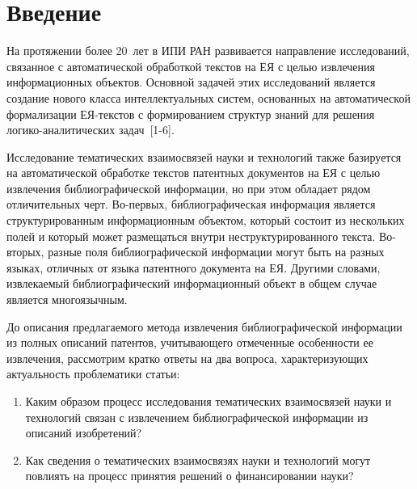 

      \thispagestyle{headings}

      \begin{multicols}{2}

            \label{st\stat}

\section{Введение}
      
      На протяжении более 20~лет в ИПИ РАН развивается направление исследований, 
связанное с автоматической обработкой текстов на ЕЯ с целью 
извлечения информационных объектов. Основной задачей этих исследований является создание 
нового класса интеллектуальных систем, основанных на автоматической формализации 
      ЕЯ-текс\-тов с формированием структур знаний для решения 
      ло\-ги\-ко-ана\-ли\-ти\-че\-ских задач~[1-6].
      
      Исследование тематических взаимосвязей науки и технологий также базируется на 
автоматической обработке текстов патентных документов на ЕЯ с целью извлечения 
библиографической ин\-формации, но при этом обладает рядом отличительных черт. 
      Во-пер\-вых, библиографическая информа\-ция является структурированным 
информационным объектом, который состоит из нескольких полей и который может 
размещаться внутри неструктурированного текста. Во-вто\-рых, разные поля 
библиографической информации могут быть на разных языках, отличных от языка патентного 
документа на ЕЯ. Другими словами, извлекаемый библиографический информационный объект 
в общем случае является многоязычным.
      
      До описания предлагаемого метода извлечения библиографической информации из 
полных описаний патентов, учитывающего отмеченные особенности ее извлечения, 
рассмотрим кратко ответы на два вопроса, характеризующих актуальность проб\-ле\-ма\-ти\-ки 
статьи:\\[-16pt]
      \begin{enumerate}[(1)]
      \item Каким образом процесс исследования тематических взаимосвязей науки и 
технологий связан с извлечением библиографической информации из описаний изобретений?\\[-16pt]
      \item Как сведения о тематических взаимосвязях науки и технологий могут повлиять на 
процесс принятия решений о финансировании науки?\\[-16pt]
      \end{enumerate}
      

\end{multicols}

